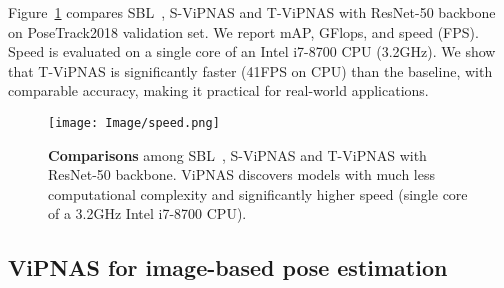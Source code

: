 \documentclass[final]{cvpr}
\begin{document}
Figure~\ref{fig:speed} compares SBL~\cite{xiao2018simple}, S-ViPNAS and T-ViPNAS with ResNet-50 backbone on PoseTrack2018 validation set. We report mAP, GFlops, and speed (FPS). Speed is evaluated on a single core of an Intel i7-8700 CPU (3.2GHz). We show that T-ViPNAS is significantly faster (41FPS on CPU) than the baseline, with comparable accuracy, making it practical for real-world applications.

\begin{figure}[t]
	\centering
	\texttt{[image: Image/speed.png]}
	\caption{\textbf{Comparisons} among SBL~\cite{xiao2018simple}, S-ViPNAS and T-ViPNAS with ResNet-50 backbone. ViPNAS discovers models with much less computational complexity and significantly higher speed (single core of a 3.2GHz Intel i7-8700 CPU).}
	\label{fig:speed}
\end{figure}



\subsection{ViPNAS for image-based pose estimation}
\label{sec:exp-single-frame}
\end{document}
